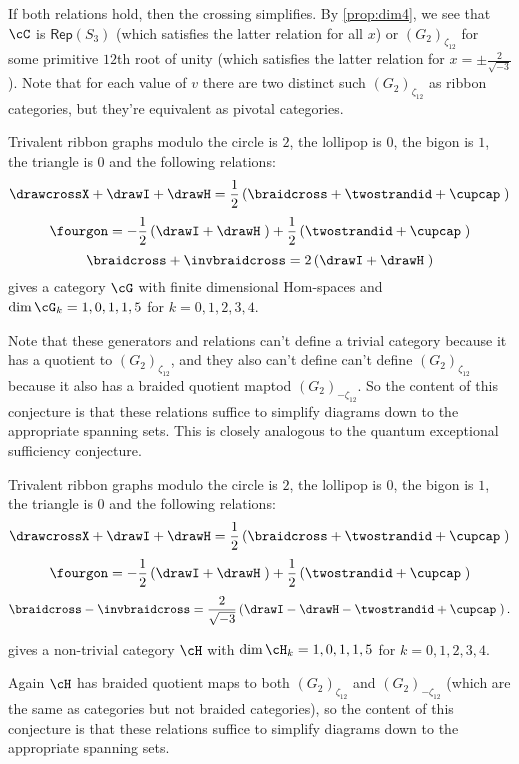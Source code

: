 \documentclass[12pt]{amsart}
\begin{document}
If both relations hold, then the crossing simplifies.  By \ref{prop:dim4}, we
see that $\cC$ is $\mathsf{Rep}(S_3)$ (which satisfies the latter relation for
all $x$) or $(G_2)_{\zeta_{12}}$ for some primitive $12$th root of unity
(which satisfies the latter relation for $x = \pm \frac{2}{\sqrt{-3}}$). Note
that for each value of $v$ there are two distinct such $(G_2)_{\zeta_{12}}$ as
ribbon categories, but they're equivalent as pivotal categories.

\begin{conjecture}
Trivalent ribbon graphs modulo the circle is $2$, the lollipop is $0$, the bigon is $1$, the triangle is $0$ and the following relations:
$$\drawcrossX + \drawI + \drawH = \frac{1}{2} \left(\braidcross + \twostrandid + \cupcap \;\right)$$
$$\fourgon = -\frac{1}{2} \left(\drawI + \drawH \;\right) + \frac{1}{2} \left(\twostrandid + \cupcap\;\right)$$
$$\braidcross + \invbraidcross = 2 \left(\drawI + \drawH \;\right)$$
gives a category $\cG$ with finite dimensional Hom-spaces and $\dim \cG_k = 1,0,1,1,5$ for $k = 0,1,2,3,4$.  
\end{conjecture}

Note that these generators and relations can't define a trivial category
because it has a quotient to  $(G_2)_{\zeta_{12}}$, and they also can't define
can't define $(G_2)_{\zeta_{12}}$ because it also has a braided quotient maptod $(G_2)_{-\zeta_{12}}$.  So the content of this conjecture
is that these relations suffice to simplify diagrams down to the appropriate
spanning sets.  This is closely analogous to the quantum exceptional sufficiency conjecture.

\begin{conjecture}
Trivalent ribbon graphs modulo the circle is $2$, the lollipop is $0$, the bigon is $1$, the triangle is $0$ and the following relations:
$$\drawcrossX + \drawI + \drawH = \frac{1}{2} \left(\braidcross + \twostrandid + \cupcap \;\right)$$
$$\fourgon = -\frac{1}{2} \left(\drawI + \drawH \;\right) + \frac{1}{2} \left(\twostrandid + \cupcap\;\right)$$
$$\braidcross - \invbraidcross = \frac{2}{\sqrt{-3}} \left(\drawI - \drawH - \twostrandid + \cupcap\;\right).$$

gives a non-trivial category $\cH$ with $\dim \cH_k = 1,0,1,1,5$ for $k = 0,1,2,3,4$.  
\end{conjecture}

Again $\cH$ has braided quotient maps to both $(G_2)_{\zeta_{12}}$ and
$(G_2)_{-\zeta_{12}}$ (which are the same as categories but not braided
categories), so the content of this conjecture is that these relations suffice
to simplify diagrams down to the appropriate spanning sets.
\end{document}
